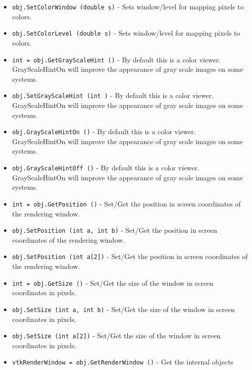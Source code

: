 \begin{itemize}
\item  \verb|obj.SetColorWindow (double s)| -  Sets window/level for mapping pixels to colors.

\item  \verb|obj.SetColorLevel (double s)| -  Sets window/level for mapping pixels to colors.

\item  \verb|int = obj.GetGrayScaleHint ()| -  By default this is a color viewer.  GrayScaleHintOn will improve the
 appearance of gray scale images on some systems.

\item  \verb|obj.SetGrayScaleHint (int )| -  By default this is a color viewer.  GrayScaleHintOn will improve the
 appearance of gray scale images on some systems.

\item  \verb|obj.GrayScaleHintOn ()| -  By default this is a color viewer.  GrayScaleHintOn will improve the
 appearance of gray scale images on some systems.

\item  \verb|obj.GrayScaleHintOff ()| -  By default this is a color viewer.  GrayScaleHintOn will improve the
 appearance of gray scale images on some systems.

\item  \verb|int = obj.GetPosition ()| -  Set/Get the position in screen coordinates of the rendering window.

\item  \verb|obj.SetPosition (int a, int b)| -  Set/Get the position in screen coordinates of the rendering window.

\item  \verb|obj.SetPosition (int a[2])| -  Set/Get the position in screen coordinates of the rendering window.

\item  \verb|int = obj.GetSize ()| -  Set/Get the size of the window in screen coordinates in pixels.

\item  \verb|obj.SetSize (int a, int b)| -  Set/Get the size of the window in screen coordinates in pixels.

\item  \verb|obj.SetSize (int a[2])| -  Set/Get the size of the window in screen coordinates in pixels.

\item  \verb|vtkRenderWindow = obj.GetRenderWindow ()| -  Get the internal objects


\end{itemize}
